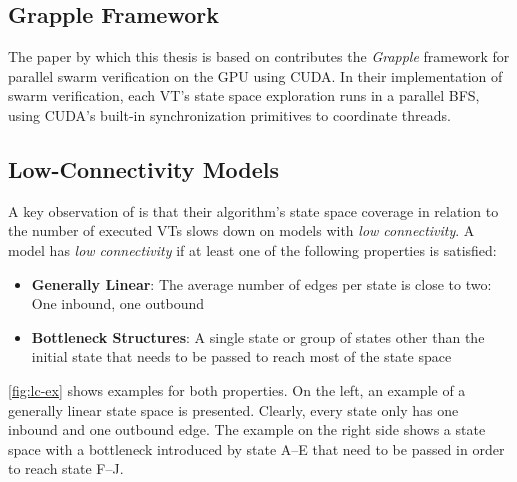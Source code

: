 \documentclass[
fancyheadings, %
%
%
]{stsreprt}
\newcommand{\citeinline}[1]{\citetitle{#1} by \citeauthor*{#1} \cite{#1}}
\begin{document}
\subsection{Grapple Framework}

The paper \citeinline{DeFrancisco2020.Grapple} which this thesis is based on contributes the \emph{Grapple} framework for parallel swarm verification on the GPU using CUDA.
In their implementation of swarm verification, each VT's state space exploration runs in a parallel BFS, using CUDA's built-in synchronization primitives to coordinate threads.


\subsection {Low-Connectivity Models}

A key observation of \cite{DeFrancisco2020.Grapple} is that their algorithm's state space coverage in relation to the number of executed VTs slows down on models with \emph{low connectivity}.
A model has \emph{low connectivity} if at least one of the following properties is satisfied:

\begin{itemize}
    \item \textbf{Generally Linear}: The average number of edges per state is close to two: One inbound, one outbound
    \item \textbf{Bottleneck Structures}: A single state or group of states other than the initial state that needs to be passed to reach most of the state space
\end{itemize}

\cref{fig:lc-ex} shows examples for both properties.
On the left, an example of a generally linear state space is presented.
Clearly, every state only has one inbound and one outbound edge.
The example on the right side shows a state space with a bottleneck introduced by state A--E that need to be passed in order to reach state F--J.

\end{document}

